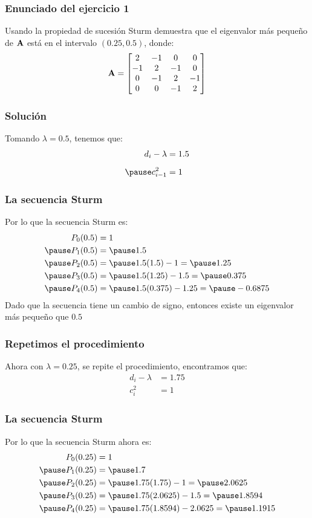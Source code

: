 \documentclass[12pt]{beamer}
\begin{document}
\begin{frame}
\frametitle{Enunciado del ejercicio 1}
Usando la propiedad de sucesión Sturm demuestra que el eigenvalor más pequeño de $\vb{A}$ está en el intervalo $(0.25, 0.5)$, donde:
\pause
\begin{align*}
\vb{A} = 
\begin{bmatrix}
2 & -1 & 0 & 0 \\
-1 & 2 & -1 & 0 \\
0 & -1 & 2 & -1 \\
0 & 0 & -1 & 2
\end{bmatrix}
\end{align*}
\end{frame}
\begin{frame}
\frametitle{Solución}
Tomando $\lambda = 0.5$, \pause tenemos que:
\pause
\begin{eqnarray*}
\begin{aligned}
d_{i} - \lambda &= 1.5 \\[0.5em] \pause
c_{i-1}^{2} &= 1
\end{aligned}
\end{eqnarray*}
\end{frame}
\begin{frame}
\frametitle{La secuencia Sturm}
Por lo que la secuencia Sturm es:
\begin{eqnarray*}
\begin{aligned}
P_{0} (0.5) &= 1 \\ \pause 
P_{1} (0.5) &= \pause 1.5 \\ \pause 
P_{2} (0.5) &= \pause 1.5 (1.5) - 1 =  \pause 1.25 \\ \pause 
P_{3} (0.5) &= \pause 1.5 (1.25) - 1.5 = \pause 0.375 \\ \pause 
P_{4} (0.5) &= \pause 1.5 (0.375) - 1.25 = \pause -0.6875
\end{aligned}
\end{eqnarray*}
\pause
Dado que la secuencia tiene un cambio de signo, entonces existe un eigenvalor más pequeño que $0.5$
\end{frame}
\begin{frame}
\frametitle{Repetimos el procedimiento}
Ahora con $\lambda = 0.25$, se repite el procedimiento, encontramos que:
\pause
\begin{align*}
d_{i} - \lambda &= 1.75 \\
c_{i}^{2} &= 1
\end{align*}
\end{frame}
\begin{frame}
\frametitle{La secuencia Sturm}
Por lo que la secuencia Sturm ahora es:
\begin{eqnarray*}
\begin{aligned}
P_{0} (0.25) &= 1 \\ \pause 
P_{1} (0.25) &= \pause 1.7 \\ \pause 
P_{2} (0.25) &= \pause 1.75 (1.75) - 1 =  \pause 2.0625 \\ \pause 
P_{3} (0.25) &= \pause 1.75 (2.0625) - 1.5 = \pause 1.8594 \\ \pause 
P_{4} (0.25) &= \pause 1.75 (1.8594) - 2.0625 = \pause 1.1915
\end{aligned}
\end{eqnarray*}
\pause
\end{frame}    
\end{document}
